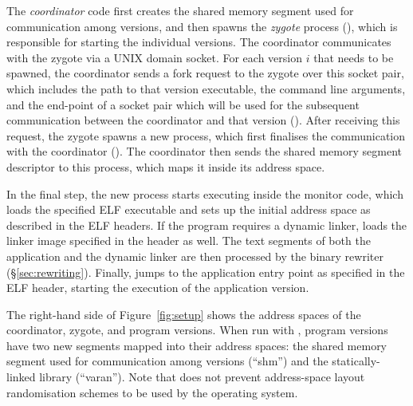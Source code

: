 

The \emph{coordinator} code first creates the shared memory segment
used for communication among versions, and then spawns the
\emph{zygote} process (), which is responsible for starting
the individual versions. The coordinator communicates with the zygote
via a UNIX domain socket. For each version $i$ that needs to be spawned,
the coordinator sends a fork request to the zygote over this socket
pair, which includes the path to that version executable, the command
line arguments, and the end-point of a socket pair which will be used
for the subsequent communication between the coordinator and that
version ().
%
After receiving this request, the zygote spawns a new process, which
first finalises the communication with the coordinator
().  The coordinator then sends the shared memory
segment descriptor to this process, which maps it inside its address
space.


In the final step, the new process starts executing inside the monitor
code, which loads the specified ELF executable and sets up the initial
address space as described in the ELF headers. If the program requires
a dynamic linker, \varan loads the linker image specified in the
header as well.
The text segments of both the application and the dynamic linker are
then processed by the binary rewriter (\S\ref{sec:rewriting}). Finally,
\varan jumps to the application entry point as specified in the ELF header,
starting the execution of the application version.

The right-hand side of Figure~\ref{fig:setup} shows the address spaces
of the coordinator, zygote, and program versions.  When run with
\varan, program versions have two new segments mapped into their
address spaces: the shared memory segment used for communication among
versions (``shm'') and the \varan statically-linked library
(``varan'').  Note that \varan does not prevent address-space layout
randomisation schemes to be used by the operating system.

